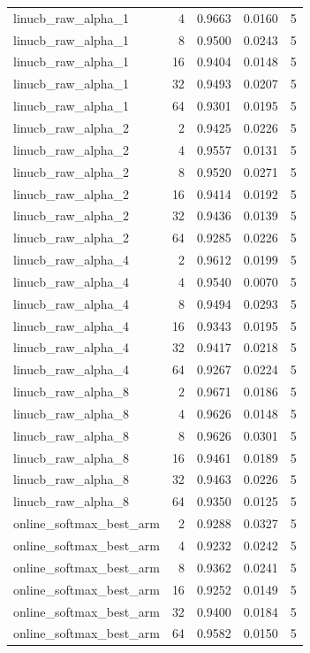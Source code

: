 \begin{table}[t]
\begin{tabular}{lrrrr}
linucb\_raw\_alpha\_1 & 4 & 0.9663 & 0.0160 & 5 \\
linucb\_raw\_alpha\_1 & 8 & 0.9500 & 0.0243 & 5 \\
linucb\_raw\_alpha\_1 & 16 & 0.9404 & 0.0148 & 5 \\
linucb\_raw\_alpha\_1 & 32 & 0.9493 & 0.0207 & 5 \\
linucb\_raw\_alpha\_1 & 64 & 0.9301 & 0.0195 & 5 \\
linucb\_raw\_alpha\_2 & 2 & 0.9425 & 0.0226 & 5 \\
linucb\_raw\_alpha\_2 & 4 & 0.9557 & 0.0131 & 5 \\
linucb\_raw\_alpha\_2 & 8 & 0.9520 & 0.0271 & 5 \\
linucb\_raw\_alpha\_2 & 16 & 0.9414 & 0.0192 & 5 \\
linucb\_raw\_alpha\_2 & 32 & 0.9436 & 0.0139 & 5 \\
linucb\_raw\_alpha\_2 & 64 & 0.9285 & 0.0226 & 5 \\
linucb\_raw\_alpha\_4 & 2 & 0.9612 & 0.0199 & 5 \\
linucb\_raw\_alpha\_4 & 4 & 0.9540 & 0.0070 & 5 \\
linucb\_raw\_alpha\_4 & 8 & 0.9494 & 0.0293 & 5 \\
linucb\_raw\_alpha\_4 & 16 & 0.9343 & 0.0195 & 5 \\
linucb\_raw\_alpha\_4 & 32 & 0.9417 & 0.0218 & 5 \\
linucb\_raw\_alpha\_4 & 64 & 0.9267 & 0.0224 & 5 \\
linucb\_raw\_alpha\_8 & 2 & 0.9671 & 0.0186 & 5 \\
linucb\_raw\_alpha\_8 & 4 & 0.9626 & 0.0148 & 5 \\
linucb\_raw\_alpha\_8 & 8 & 0.9626 & 0.0301 & 5 \\
linucb\_raw\_alpha\_8 & 16 & 0.9461 & 0.0189 & 5 \\
linucb\_raw\_alpha\_8 & 32 & 0.9463 & 0.0226 & 5 \\
linucb\_raw\_alpha\_8 & 64 & 0.9350 & 0.0125 & 5 \\
online\_softmax\_best\_arm & 2 & 0.9288 & 0.0327 & 5 \\
online\_softmax\_best\_arm & 4 & 0.9232 & 0.0242 & 5 \\
online\_softmax\_best\_arm & 8 & 0.9362 & 0.0241 & 5 \\
online\_softmax\_best\_arm & 16 & 0.9252 & 0.0149 & 5 \\
online\_softmax\_best\_arm & 32 & 0.9400 & 0.0184 & 5 \\
online\_softmax\_best\_arm & 64 & 0.9582 & 0.0150 & 5 \\

\end{tabular}
\end{table}
